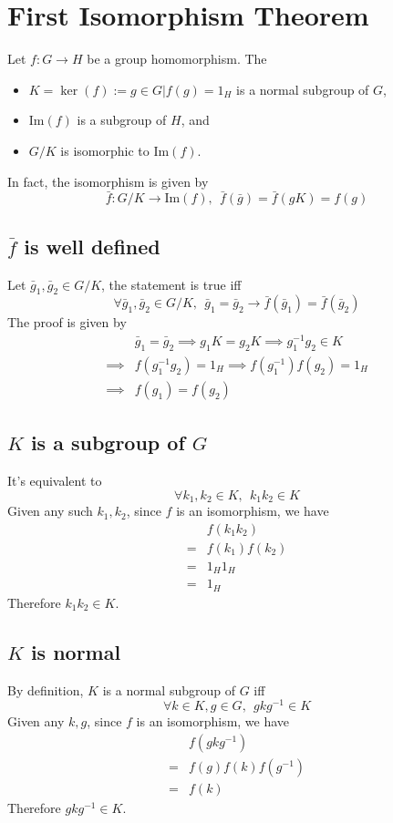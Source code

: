\documentclass{article}
\renewcommand{\Im}{\text{Im}}
\begin{document}
	\section*{First Isomorphism Theorem}
	Let $f:G\rightarrow H$ be a group homomorphism. The
	\begin{itemize}
		\item $K=\ker(f):={g\in G|f(g)=1_H}$ is a normal subgroup of $G$,
		\item $\Im(f)$ is a subgroup of $H$, and
		\item $G/K$ is isomorphic to $\Im(f)$.
	\end{itemize}
	In fact, the isomorphism is given by$$
		\bar{f}:G/K\rightarrow\Im(f),\ \ \bar{f}(\bar{g})=\bar{f}(gK)=f(g)
	$$
	\subsection*{$\bar{f}$ is well defined}
	Let $\bar{g}_1,\bar{g}_2\in G/K$, the statement is true iff$$
		\forall \bar{g}_1,\bar{g}_2\in G/K,\ \ \bar{g}_1=\bar{g}_2 \rightarrow \bar{f}(\bar{g}_1)=\bar{f}(\bar{g}_2)
	$$
	The proof is given by\begin{align*}
		&\bar{g}_1=\bar{g}_2 \implies g_1K=g_2K \implies g_1^{-1}g_2\in K\\
		\implies& f(g_1^{-1}g_2)=1_H \implies f(g_1^{-1})f(g_2)=1_H\\
		\implies& f(g_1)=f(g_2)
	\end{align*}
	\subsection*{$K$ is a subgroup of $G$}
	It's equivalent to $$
		\forall k_1,k_2\in K,\ \ k_1k_2\in K
	$$
	Given any such $k_1,k_2$, since $f$ is an isomorphism, we have\begin{align*}
		&f(k_1k_2)\\
		=&f(k_1)f(k_2)\\
		=&1_H1_H\\
		=&1_H
	\end{align*}
	Therefore $k_1k_2\in K$.
	\subsection*{$K$ is normal}
	By definition, $K$ is a normal subgroup of $G$ iff $$
		\forall k\in K, g\in G,\ \ gkg^{-1}\in K
	$$
	Given any $k,g$, since $f$ is an isomorphism, we have\begin{align*}
		&f(gkg^{-1})\\
		=&f(g)f(k)f(g^{-1})\\
		=&f(k)
	\end{align*}
	Therefore $gkg^{-1}\in K$.
\end{document}
